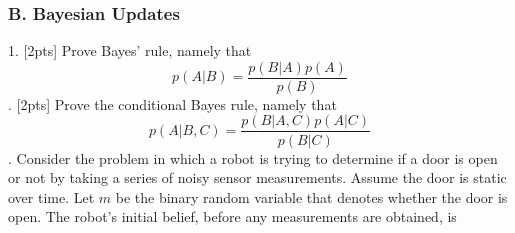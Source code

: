 \documentclass[a4paper,10pt]{article}
\begin{document}
\subsubsection*{B. Bayesian Updates}
1. [2pts] Prove Bayes' rule, namely that 
\begin{equation}
p(A|B)=\frac{p(B|A)p(A)}{p(B)} \nonumber
\end{equation}
\newline
\newline
\newline
\newline
\newline
\newline
\newline
\newline
\newline
\newline
\newline
\newline
\newline
\newline
\newline
\newline
\newline
{}. [2pts] Prove the conditional Bayes rule, namely that 
\begin{equation}
p(A|B,C)=\frac{p(B|A,C)p(A|C)}{p(B|C)} \nonumber
\end{equation}
\newline
\newline
\newline
\newline
\newline
\newline
\newline
\newline
\newline
\newline
\newline
\newline
\newline
\newline
\newline
\newline
\newline
{}. Consider the problem in which a robot is trying to determine if a door is open or not by taking 
a series of noisy sensor measurements. Assume the door is static over time. Let $m$ be the binary random variable 
that denotes whether the door is open. The robot's initial belief, before any measurements are obtained, is 
\end{document}

